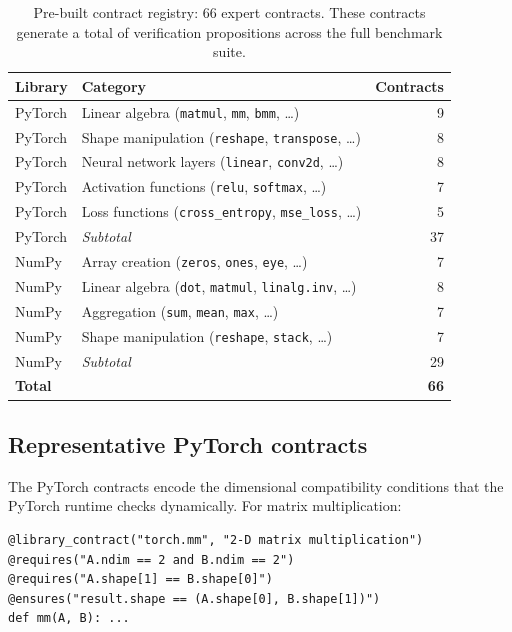 \documentclass[11pt]{article}
\newcommand{\nPT}{37}                      %
\newcommand{\nNP}{29}                      %
\newcommand{\nTotal}{66}                   %
\begin{document}
\begin{table}[h]
\centering
\caption{Pre-built contract registry: \nTotal{} expert contracts.
  These contracts generate a total of \compPropsSum{} verification
  propositions across the full benchmark suite.}
\label{tab:registry}
\begin{tabular}{llr}
\toprule
\textbf{Library} & \textbf{Category} & \textbf{Contracts} \\
\midrule
PyTorch & Linear algebra (\texttt{matmul}, \texttt{mm}, \texttt{bmm}, \ldots) & 9 \\
PyTorch & Shape manipulation (\texttt{reshape}, \texttt{transpose}, \ldots) & 8 \\
PyTorch & Neural network layers (\texttt{linear}, \texttt{conv2d}, \ldots) & 8 \\
PyTorch & Activation functions (\texttt{relu}, \texttt{softmax}, \ldots) & 7 \\
PyTorch & Loss functions (\texttt{cross\_entropy}, \texttt{mse\_loss}, \ldots) & 5 \\
\midrule
PyTorch & \emph{Subtotal} & \nPT{} \\
\midrule
NumPy & Array creation (\texttt{zeros}, \texttt{ones}, \texttt{eye}, \ldots) & 7 \\
NumPy & Linear algebra (\texttt{dot}, \texttt{matmul}, \texttt{linalg.inv}, \ldots) & 8 \\
NumPy & Aggregation (\texttt{sum}, \texttt{mean}, \texttt{max}, \ldots) & 7 \\
NumPy & Shape manipulation (\texttt{reshape}, \texttt{stack}, \ldots) & 7 \\
\midrule
NumPy & \emph{Subtotal} & \nNP{} \\
\midrule
\textbf{Total} & & \textbf{\nTotal{}} \\
\bottomrule
\end{tabular}
\end{table}

\subsection{Representative PyTorch contracts}

The PyTorch contracts encode the dimensional compatibility conditions
that the PyTorch runtime checks dynamically.  For matrix
multiplication:

\begin{lstlisting}[style=jugeo-python,
  caption={PyTorch \texttt{torch.mm}: 2-D matrix multiplication contract.}]
@library_contract("torch.mm", "2-D matrix multiplication")
@requires("A.ndim == 2 and B.ndim == 2")
@requires("A.shape[1] == B.shape[0]")
@ensures("result.shape == (A.shape[0], B.shape[1])")
def mm(A, B): ...
\end{lstlisting}
\end{document}
